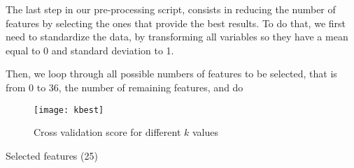 The last step in our pre-processing script, consists in reducing the number of features
by selecting the ones that provide the best results. To do that, we first need to
standardize the data, by transforming all variables so they have a mean equal to 0
and standard deviation to 1.

Then, we loop through all possible numbers of features to be selected, that is from 0
to 36, the number of remaining features, and do 


\begin{figure}[H]
    \centering
    \texttt{[image: kbest]}
    \caption{Cross validation score for different $k$ values}%
    \label{fig:feature_cross}
\end{figure}

\begin{table}[H]
    \centering
    \caption{Selected features (25)}%
    \label{tab:features}
    
\end{table}